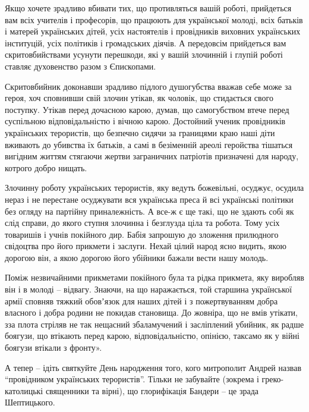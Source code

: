 Якщо хочете зрадливо вбивати тих, що противляться вашій роботі, прийдеться вам
всіх учителів і професорів, що працюють для української молоді, всіх батьків і
матерей українських дітей, усіх настоятелів і провідників виховних українських
інституцій, усіх політиків і громадських діячів. А передовсім прийдеться вам
скритовбийствами усунути перешкоди, які у вашій злочинній і глупій роботі
ставляє духовенство разом з Єпископами.

Скритовбийник доконавши зрадливо підлого душогубства вважав себе може за героя,
хоч сповнивши свій злочин утікав, як чоловік, що стидається свого поступку.
Утікав перед дочасною карою, думав, що самогубством втече перед суспільною
відповідальністю і вічною карою. Достойний ученик провідників українських
терористів, що безпечно сидячи за границями краю наші діти вживають до убивства
їх батьків, а самі в безіменній ареолі геройства тішаться вигідним життям
стягаючи жертви заграничних патріотів призначені для народу, котрого добро
нищать.

Злочинну роботу українських терористів, яку ведуть божевільні, осуджує, осудила
нераз і не перестане осуджувати вся українська преса й всі українські політики
без огляду на партійну приналежність. А все-ж є ще такі, що не здають собі як
слід справи, до якого ступня злочинна і безглузда ціла та робота. Тому усіх
товаришів і учнів покійного дир. Бабія запрошую до зложення прилюдного
свідоцтва про його прикмети і заслуги. Нехай цілий народ ясно видить, якою
дорогою він, а якою дорогою його убійники бажали вести нашу молодь.

Поміж незвичайними прикметами покійного була та рідка прикмета, яку виробляв
він і в молоді – відвагу. Знаючи, на що наражається, той старшина української
армії сповняв тяжкий обовʼязок для наших дітей і з пожертвуванням добра
власного і добра родини не покидав становища. До жовніра, що не вмів утікати,
зза плота стріляв не так нещасний збаламучений і засліплений убийник, як радше
боягузи, що втікають перед карою, відповідальністю, опінією, таксамо як у війні
боягузи втікали з фронту».

А тепер – ідіть святкуйте День народження того, кого митрополит Андрей назвав
\enquote{провідником українських терористів}. Тільки не забувайте (зокрема і
греко-католицькі священники та вірні), що глорифікація Бандери – це зрада
Шептицького.

